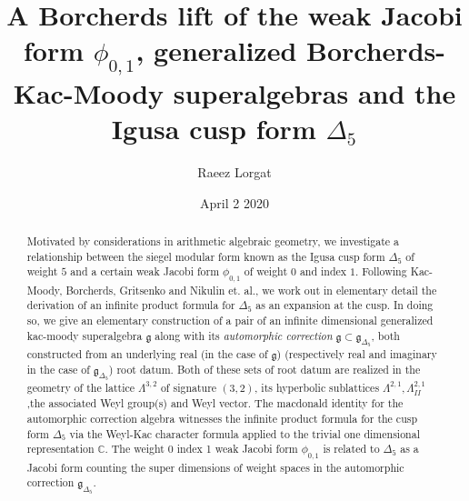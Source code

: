 \documentclass[9pt]{amsart} \usepackage[utf8]{inputenc}
\title{A Borcherds lift of the weak Jacobi form $\phi_{0,1}$,
generalized Borcherds-Kac-Moody superalgebras and the Igusa cusp form $\Delta_5$}
\author{Raeez Lorgat } \date{April 2 2020}
\newcommand{\Z}{\mathbb{Z}} \newcommand{\C}{\mathbb{C}}
\newcommand{\R}{\mathbb{R}} \newcommand{\La}{\Lambda}
\newcommand{\Sp}{\mathbf{Sp}}
\newcommand{\Hpl}{\mathbb{H}}
\newcommand{\IV}{\mathbf{IV}}
\newcommand{\fbasis}{(f_i)_{\{1,2,3,-2,-1\}}}
\newcommand{\Id}{\mathbf{I}}
\newcommand{\bkm}{\mathfrak{g}}
\newcommand{\autcor}{\mathfrak{g}_{\Delta_5}}
\begin{document}
\maketitle

\begin{abstract} Motivated by considerations in arithmetic algebraic geometry, we investigate a relationship between the siegel
modular form known as the Igusa cusp form $\Delta_5$ of weight $5$ and a
certain weak Jacobi form $\phi_{0,1}$ of weight $0$ and index $1$. Following
Kac-Moody, Borcherds, Gritsenko and Nikulin et. al., we work out in
elementary detail the derivation of an infinite product formula for
$\Delta_5$ as an expansion at the cusp. In doing so, we give an elementary
construction of a pair of an infinite dimensional generalized kac-moody
superalgebra $\bkm$ along with its \textit{automorphic
correction} $\bkm\subset
\autcor$, both constructed from an underlying
real (in the case of $\bkm$) (respectively real and
imaginary in the case of $\autcor$) root datum.
Both of these sets of root datum are realized in the geometry of the
lattice $\La^{3,2}$ of signature $(3,2)$, its hyperbolic
sublattices $\La^{2,1}, \La^{2,1}_{II}$,the associated Weyl group(s) and
Weyl vector. The macdonald identity for the automorphic correction
algebra witnesses the infinite product formula for the cusp form
$\Delta_5$ via the Weyl-Kac character formula applied to the trivial one
dimensional representation $\C$. The weight 0 index 1 weak Jacobi form
$\phi_{0,1}$ is related to $\Delta_5$ as a Jacobi form counting the
super dimensions of weight spaces in the automorphic
correction $\autcor$.  \end{abstract}

\end{document}

